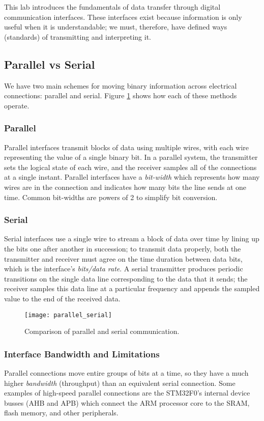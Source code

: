 \documentclass[openany,11pt,fleqn]{book} %
\begin{document}
This lab introduces the fundamentals of data transfer through digital communication interfaces. These interfaces exist because information is only useful when it is understandable; we must, therefore, have defined ways (standards) of transmitting and interpreting it.

\subsection{Parallel vs Serial}

We have two main schemes for moving binary information across electrical connections: parallel and serial. Figure \ref{parallel_serial} shows how each of these methods operate. 

\subsubsection{Parallel}
Parallel interfaces transmit blocks of data using multiple wires, with each wire representing the value of a single binary bit. In a parallel system, the transmitter sets the logical state of each wire, and the receiver samples all of the connections at a single instant. Parallel interfaces have a \textit{bit-width} which represents how many wires are in the connection and indicates how many bits the line sends at one time. Common bit-widths are powers of 2 to simplify bit conversion. 

\subsubsection{Serial}
Serial interfaces use a single wire to stream a block of data over time by lining up the bits one after another in succession; to transmit data properly, both the transmitter and receiver must agree on the time duration between data bits, which is the interface's \textit{bits/data rate}. A serial transmitter produces periodic transitions on the single data line corresponding to the data that it sends; the receiver samples this data line at a particular frequency and appends the sampled value to the end of the received data. 

\begin{figure}[]
    \centering\texttt{[image: parallel\_serial]}
    \caption{Comparison of parallel and serial communication.}
    \label{parallel_serial}
\end{figure}

\subsubsection{Interface Bandwidth and Limitations}
Parallel connections move entire groups of bits at a time, so they have a much higher \textit{bandwidth} (throughput) than an equivalent serial connection. Some examples of high-speed parallel connections are the STM32F0's internal device busses (AHB and APB) which connect the ARM processor core to the SRAM, flash memory, and other peripherals.
\end{document}
